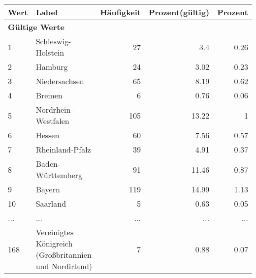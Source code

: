      \begin{longtable}{lXrrr}
     \toprule
     \textbf{Wert} & \textbf{Label} & \textbf{Häufigkeit} & \textbf{Prozent(gültig)} & \textbf{Prozent} \\
     \endhead
     \midrule
     \multicolumn{5}{l}{\textbf{Gültige Werte}}\\
        1 & \multicolumn{1}{X}{Schleswig-Holstein} & %
          \num{27} &
          \num[round-mode=places,round-precision=2]{3,4} &
          \num[round-mode=places,round-precision=2]{0,26} \\
        2 & \multicolumn{1}{X}{Hamburg} & %
          \num{24} &
          \num[round-mode=places,round-precision=2]{3,02} &
          \num[round-mode=places,round-precision=2]{0,23} \\
        3 & \multicolumn{1}{X}{Niedersachsen} & %
          \num{65} &
          \num[round-mode=places,round-precision=2]{8,19} &
          \num[round-mode=places,round-precision=2]{0,62} \\
        4 & \multicolumn{1}{X}{Bremen} & %
          \num{6} &
          \num[round-mode=places,round-precision=2]{0,76} &
          \num[round-mode=places,round-precision=2]{0,06} \\
        5 & \multicolumn{1}{X}{Nordrhein-Westfalen} & %
          \num{105} &
          \num[round-mode=places,round-precision=2]{13,22} &
          \num[round-mode=places,round-precision=2]{1} \\
        6 & \multicolumn{1}{X}{Hessen} & %
          \num{60} &
          \num[round-mode=places,round-precision=2]{7,56} &
          \num[round-mode=places,round-precision=2]{0,57} \\
        7 & \multicolumn{1}{X}{Rheinland-Pfalz} & %
          \num{39} &
          \num[round-mode=places,round-precision=2]{4,91} &
          \num[round-mode=places,round-precision=2]{0,37} \\
        8 & \multicolumn{1}{X}{Baden-Württemberg} & %
          \num{91} &
          \num[round-mode=places,round-precision=2]{11,46} &
          \num[round-mode=places,round-precision=2]{0,87} \\
        9 & \multicolumn{1}{X}{Bayern} & %
          \num{119} &
          \num[round-mode=places,round-precision=2]{14,99} &
          \num[round-mode=places,round-precision=2]{1,13} \\
        10 & \multicolumn{1}{X}{Saarland} & %
          \num{5} &
          \num[round-mode=places,round-precision=2]{0,63} &
          \num[round-mode=places,round-precision=2]{0,05} \\
       ... & ... & ... & ... & ... \\
        168 & \multicolumn{1}{X}{Vereinigtes Königreich (Großbritannien und Nordirland)} & %
          \num{7} &
          \num[round-mode=places,round-precision=2]{0,88} &
          \num[round-mode=places,round-precision=2]{0,07} \\


\end{longtable}
